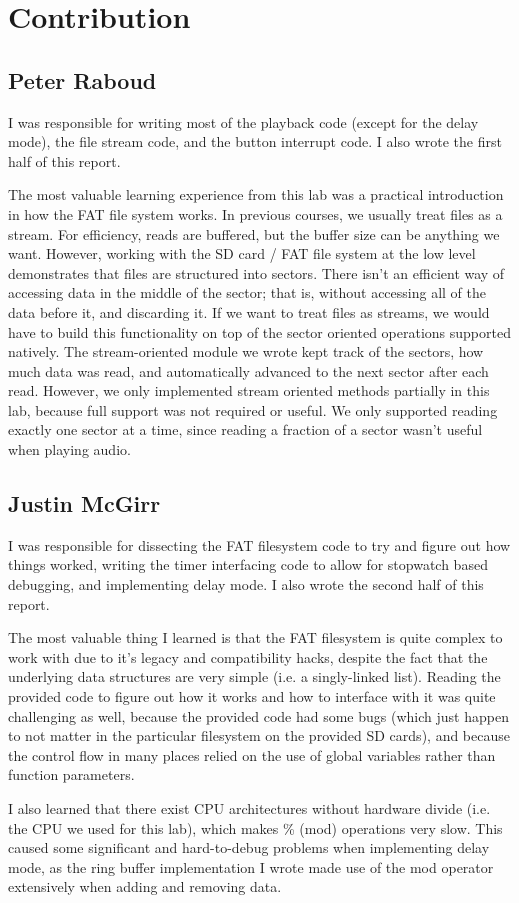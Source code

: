 \documentclass[12pt]{article}
\begin{document}
\section{Contribution}
\subsection{Peter Raboud}
I was responsible for writing most of the playback code (except for the delay mode),
the file stream code, and the button interrupt code.
I also wrote the first half of this report.

The most valuable learning experience from this lab was a practical introduction
in how the FAT file system works.
In previous courses, we usually treat files as a stream.
For efficiency, reads are buffered, but the buffer size can be anything we want.
However, working with the SD card / FAT file system at the low level demonstrates
that files are structured into sectors.
There isn't an efficient way of accessing data in the middle of the sector; that
is, without accessing all of the data before it, and discarding it.
If we want to treat files as streams, we would have to build this functionality
on top of the sector oriented operations supported natively.
The stream-oriented module we wrote kept track of the sectors, how much data was
read, and automatically advanced to the next sector after each read.
However, we only implemented stream oriented methods partially in this lab,
because full support was not required or useful.
We only supported reading exactly one sector at a time, since reading a fraction
of a sector wasn't useful when playing audio.

\subsection{Justin McGirr}
I was responsible for dissecting the FAT filesystem code to try and figure out
how things worked, writing the timer interfacing code to allow for stopwatch
based debugging, and implementing delay mode. I also wrote the second half of
this report.

The most valuable thing I learned is that the FAT filesystem is quite complex
to work with due to it's legacy and compatibility hacks, despite the fact that
the underlying data structures are very simple (i.e. a singly-linked list).
Reading the provided code to figure out how it works and how to interface with
it was quite challenging as well, because the provided code had some bugs
(which just happen to not matter in the particular filesystem on the provided
SD cards), and because the control flow in many places relied on the use of
global variables rather than function parameters.

I also learned that there exist CPU architectures without hardware divide
(i.e. the CPU we used for this lab), which makes \% (mod) operations very
slow. This caused some significant and hard-to-debug problems when implementing
delay mode, as the ring buffer implementation I wrote made use of the mod
operator extensively when adding and removing data.
\end{document}
